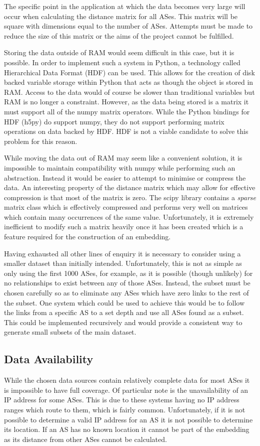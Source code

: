 The specific point in the application at which the data becomes very large will occur when calculating the distance matrix for all ASes. This matrix will be square with dimensions equal to the number of ASes. Attempts must be made to reduce the size of this matrix or the aims of the project cannot be fulfilled.

Storing the data outside of RAM would seem difficult in this case, but it is possible. In order to implement such a system in Python, a technology called Hierarchical Data Format (HDF) can be used. This allows for the creation of disk backed variable storage within Python that acts as though the object is stored in RAM. Access to the data would of course be slower than traditional variables but RAM is no longer a constraint. However, as the data being stored is a matrix it must support all of the numpy matrix operators. While the Python bindings for HDF (h5py) do support numpy, they do not support performing matrix operations on data backed by HDF. HDF is not a viable candidate to solve this problem for this reason.

While moving the data out of RAM may seem like a convenient solution, it is impossible to maintain compatibility with numpy while performing such an abstraction. Instead it would be easier to attempt to minimise or compress the data. An interesting property of the distance matrix which may allow for effective compression is that most of the matrix is zero. The scipy library contains a \textit{sparse} matrix class which is effectively compressed and performs very well on matrices which contain many occurrences of the same value. Unfortunately, it is extremely inefficient to modify such a matrix heavily once it has been created which is a feature required for the construction of an embedding. 

Having exhausted all other lines of enquiry it is necessary to consider using a smaller dataset than initially intended. Unfortunately, this is not as simple as only using the first 1000 ASes, for example, as it is possible (though unlikely) for no relationships to exist between any of those ASes. Instead, the subset must be chosen carefully so as to eliminate any ASes which have zero links to the rest of the subset. One system which could be used to achieve this would be to follow the links from a specific AS to a set depth and use all ASes found as a subset. This could be implemented recursively and would provide a consistent way to generate small subsets of the main dataset.

\subsection{Data Availability}
While the chosen data sources contain relatively complete data for most ASes it is impossible to have full coverage. Of particular note is the unavailability of an IP address for some ASes. This is due to these systems having no IP address ranges which route to them, which is fairly common. Unfortunately, if it is not possible to determine a valid IP address for an AS it is not possible to determine its location. If an AS has no known location it cannot be part of the embedding as its distance from other ASes cannot be calculated. 

